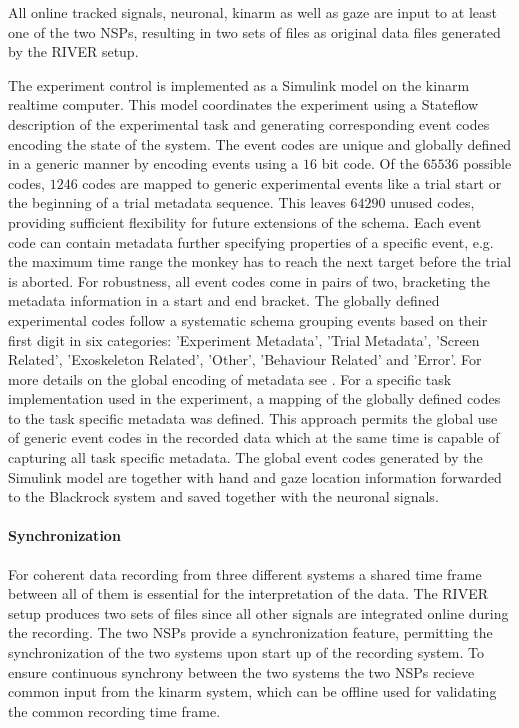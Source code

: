 All online tracked signals, neuronal, kinarm as well as gaze are input to at least one of the  two NSPs, resulting in two sets of  files as original data files generated by the RIVER setup.

The experiment control is implemented as a Simulink model on the kinarm realtime computer. This model coordinates the experiment using a Stateflow description of the experimental task and generating corresponding event codes encoding the state of the system. The event codes are unique and globally defined in a generic manner by encoding events using a $16$ bit code. Of the $65536$ possible codes, $1246$ codes are mapped to generic experimental events like a trial start or the beginning of a trial metadata sequence. This leaves $64290$ unused codes, providing sufficient flexibility for future extensions of the schema. Each event code can contain metadata further specifying properties of a specific event, e.g. the maximum time range the monkey has to reach the next target before the trial is aborted. For robustness, all event codes come in pairs of two, bracketing the metadata information in a start and end bracket. The globally defined experimental codes follow a systematic schema grouping events based on their first digit in six categories: 'Experiment Metadata', 'Trial Metadata', 'Screen Related', 'Exoskeleton Related', 'Other', 'Behaviour Related' and 'Error'. For more details on the global encoding of metadata see \citet{deHaan_2018a}.
For a specific task implementation used in the experiment, a mapping of the globally defined codes to the task specific metadata was defined. This approach permits the global use of generic event codes in the recorded data which at the same time is capable of capturing all task specific metadata. The global event codes generated by the Simulink model are together with hand and gaze location information forwarded to the Blackrock system and saved together with the neuronal signals.

\paragraph{Synchronization}
For coherent data recording from three different systems a shared time frame between all of them is essential for the interpretation of the data. The RIVER setup produces two sets of  files since all other signals are integrated online during the recording. The two NSPs provide a synchronization feature, permitting the synchronization of the two systems upon start up of the recording system. To ensure continuous synchrony between the two systems the two NSPs recieve common input from the kinarm system, which can be offline used for validating the common recording time frame.

